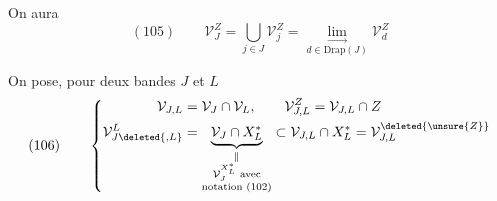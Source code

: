
On aura
\[(105)\qquad\mathcal V_J^Z=\bigcup_{j\in J}\mathcal V_j^Z=\underset{d\in\mathrm{Drap}(J)}{\lim_{\longrightarrow}}\mathcal V_d^Z\]

On pose, pour deux bandes $J$ et $L$
\[
(106)\qquad\left\{\begin{aligned}
\mathcal V_{J,L}&=\mathcal V_J\cap\mathcal V_L,\qquad\mathcal V_{J,L}^Z=\mathcal V_{J,L}\cap Z\\
\mathcal V_{J\deleted{,L}}^L&=\underbrace{\mathcal V_J\cap X_L^*}_{\substack{\Vert\\\mathcal V_J^{X_L^*}\text{ avec}\\\text{notation }(102)}}\subset\mathcal V_{J,L}\cap X_L^*=\mathcal V_{J,L}^{\deleted{\unsure{Z}}}
\end{aligned}\right.
\]


